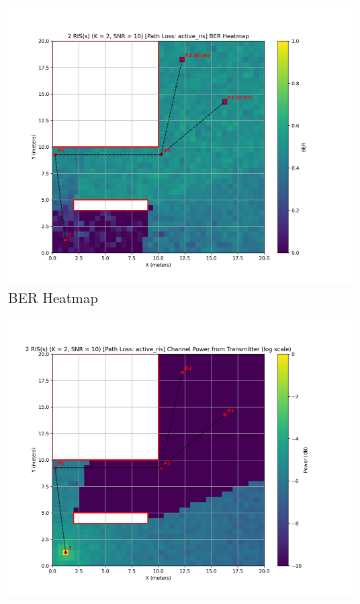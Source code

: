 \begin{figure}[H]
  \centering
  \begin{subfigure}[b]{0.48\textwidth}
    \centering
    \includegraphics[width=\textwidth]{imgs/heatmap-simulations/2 RIS(s) (K = 2, SNR = 10) [Path Loss_ active_ris] BER Heatmap.png}
    \caption{BER Heatmap}
  \end{subfigure}
  \hfill
  \begin{subfigure}[b]{0.48\textwidth}
    \centering
    \includegraphics[width=\textwidth]{imgs/heatmap-simulations/2 RIS(s) (K = 2, SNR = 10) [Path Loss_ active_ris] Channel Power from Transmitter (log scale).png}

\end{subfigure}
\end{figure}
